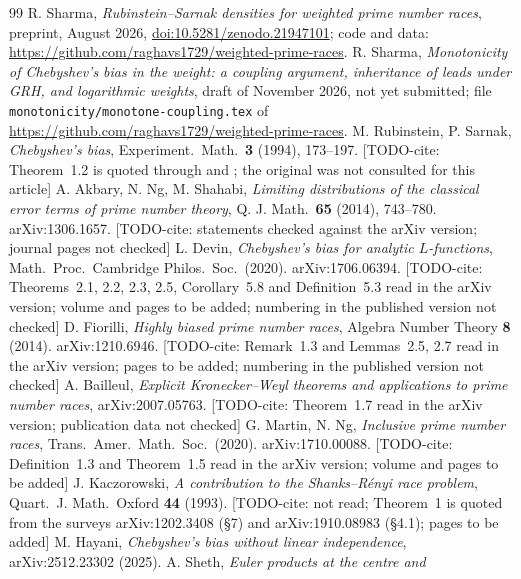 \documentclass[11pt]{amsart}
\theoremstyle{definition}
\numberwithin{equation}{section}
\newcommand{\todocite}[1]{\textsf{[TODO-cite: #1]}}
\begin{document}
\begin{thebibliography}{99}
 R. Sharma, \emph{Rubinstein--Sarnak densities for
weighted prime number races}, preprint, August 2026,
\href{https://doi.org/10.5281/zenodo.21947101}{doi:10.5281/zenodo.21947101};
code and data: \url{https://github.com/raghavs1729/weighted-prime-races}.
 R. Sharma, \emph{Monotonicity of Chebyshev's bias in the
weight: a coupling argument, inheritance of leads under GRH, and
logarithmic weights}, draft of November 2026, not yet submitted; file
\texttt{monotonicity/monotone-coupling.tex} of
\url{https://github.com/raghavs1729/weighted-prime-races}.
 M. Rubinstein, P. Sarnak, \emph{Chebyshev's bias},
Experiment.\ Math.\ \textbf{3} (1994), 173--197.
\todocite{Theorem~1.2 is quoted through \cite{Dev20} and
\cite{Fio14}; the original was not consulted for this article}
 A. Akbary, N. Ng, M. Shahabi, \emph{Limiting
distributions of the classical error terms of prime number theory},
Q. J. Math.\ \textbf{65} (2014), 743--780. arXiv:1306.1657.
\todocite{statements checked against the arXiv version; journal pages
not checked}
 L. Devin, \emph{Chebyshev's bias for analytic
$L$-functions}, Math.\ Proc.\ Cambridge Philos.\ Soc.\ (2020).
arXiv:1706.06394. \todocite{Theorems~2.1, 2.2, 2.3, 2.5,
Corollary~5.8 and Definition~5.3 read in the arXiv version; volume
and pages to be added; numbering in the published version not
checked}
 D. Fiorilli, \emph{Highly biased prime number races},
Algebra Number Theory \textbf{8} (2014). arXiv:1210.6946.
\todocite{Remark~1.3 and Lemmas~2.5, 2.7 read in the arXiv version;
pages to be added; numbering in the published version not checked}
 A. Bailleul, \emph{Explicit Kronecker--Weyl theorems
and applications to prime number races}, arXiv:2007.05763.
\todocite{Theorem~1.7 read in the arXiv version; publication data not
checked}
 G. Martin, N. Ng, \emph{Inclusive prime number races},
Trans.\ Amer.\ Math.\ Soc.\ (2020). arXiv:1710.00088.
\todocite{Definition~1.3 and Theorem~1.5 read in the arXiv version;
volume and pages to be added}
 J. Kaczorowski, \emph{A contribution to the
Shanks--R\'enyi race problem}, Quart.\ J. Math.\ Oxford
\textbf{44} (1993). \todocite{not read; Theorem~1 is quoted from the
surveys arXiv:1202.3408 (\S7) and arXiv:1910.08983 (\S4.1); pages to
be added}
 M. Hayani, \emph{Chebyshev's bias without linear
independence}, arXiv:2512.23302 (2025).
 A. Sheth, \emph{Euler products at the centre and
}
\end{thebibliography}
\end{document}
